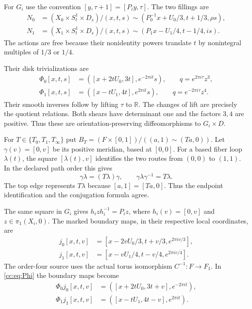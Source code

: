 For $G_i$ use the convention
$[y,\tau+1]=[P_i y,\tau]$.
The two fillings are
\begin{equation}\label{cc:eq:fillings}
\begin{aligned}
N_0&=(X_0\times S^1_t\times D_s)/
 (x,t,s)\sim(P_0^{-1}x+U_0/3,t+1/3,\rho s),\\
N_1&=(X_1\times S^1_t\times D_s)/
 (x,t,s)\sim(P_1x-U_1/4,t-1/4,is).
\end{aligned}
\end{equation}
The actions are free because their nonidentity powers translate $t$ by
nonintegral multiples of $1/3$ or $1/4$.

Their disk trivializations are
\begin{equation}\label{cc:eq:Phi}
\begin{aligned}
\Phi_0[x,t,s]&=([x+2tU_0,3t],e^{-2\pi it}s),\qquad q=e^{2\pi i\tau}z^3,\\
\Phi_1[x,t,s]&=([x-tU_1,4t],e^{2\pi it}s),\qquad q=e^{-2\pi i\tau}z^4.
\end{aligned}
\end{equation}
Their smooth inverses follow by lifting $\tau$ to $\mathbb R$.
The changes of lift are precisely the quotient relations.
Both shears have determinant one and the factors $3,4$ are positive.
Thus these are orientation-preserving diffeomorphisms to $G_i\times D$.

For $T\in\{T_0,T_1,T_\infty\}$ put
$B_T=(F\times[0,1])/((a,1)\sim(Ta,0))$.
Let $\gamma(v)=[0,v]$ be its positive meridian, based at $[0,0]$.
For a based fiber loop $\lambda(t)$, the square $[\lambda(t),v]$
identifies the two routes from $(0,0)$ to $(1,1)$.
In the declared path order this gives
\begin{equation}\label{cc:eq:square-conjugation}
\gamma\lambda=(T\lambda)\gamma,
\qquad \gamma\lambda\gamma^{-1}=T\lambda.
\end{equation}
The top edge represents $T\lambda$ because $[a,1]=[Ta,0]$.
Thus the endpoint identification and the conjugation formula agree.

The same square in $G_i$ gives $h_i z h_i^{-1}=P_i z$,
where $h_i(v)=[0,v]$ and $z\in\pi_1(X_i,0)$.
The marked boundary maps, in their respective local coordinates, are
\begin{equation}\label{cc:eq:boundary}
\begin{aligned}
j_0[x,t,v]&=[x-2vU_0/3,t+v/3,e^{2\pi iv/3}],\\
j_1[x,t,v]&=[x-vU_1/4,t-v/4,e^{2\pi iv/4}].
\end{aligned}
\end{equation}
The order-four source uses the actual torus isomorphism
$C^{-1}:F\longrightarrow F_1$. In \eqref{cc:eq:Phi} the boundary maps become
\begin{equation}\label{cc:eq:k}
\begin{aligned}
\Phi_0j_0[x,t,v]&=([x+2tU_0,3t+v],e^{-2\pi it}),\\
\Phi_1j_1[x,t,v]&=([x-tU_1,4t-v],e^{2\pi it}).
\end{aligned}
\end{equation}


